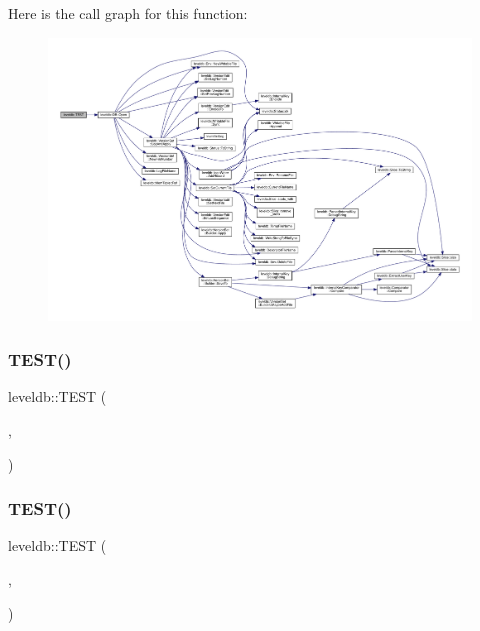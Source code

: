 Here is the call graph for this function\+:
\nopagebreak
\begin{figure}[H]
\begin{center}
\leavevmode
\includegraphics[width=350pt]{namespaceleveldb_a8470163c7e8b292085a5b60f989dc828_cgraph}
\end{center}
\end{figure}
\mbox{\label{namespaceleveldb_a11f56de4abca34391c0e60f311262b65}} 
\subsubsection{\texorpdfstring{TEST()}{TEST()}\hspace{0.1cm}{\footnotesize\ttfamily [93/102]}}
{\footnotesize\ttfamily leveldb\+::\+T\+E\+ST (\begin{DoxyParamCaption}\item[{\mbox{\hyperlink{classleveldb_1_1_d_b_test}{D\+B\+Test}}}]{,  }\item[{No\+Space}]{ }\end{DoxyParamCaption})}

\mbox{\label{namespaceleveldb_a9d69b380c464519a1b946fb1faa21cbd}} 
\subsubsection{\texorpdfstring{TEST()}{TEST()}\hspace{0.1cm}{\footnotesize\ttfamily [94/102]}}
{\footnotesize\ttfamily leveldb\+::\+T\+E\+ST (\begin{DoxyParamCaption}\item[{\mbox{\hyperlink{classleveldb_1_1_d_b_test}{D\+B\+Test}}}]{,  }\item[{Non\+Writable\+File\+System}]{ }\end{DoxyParamCaption})}


